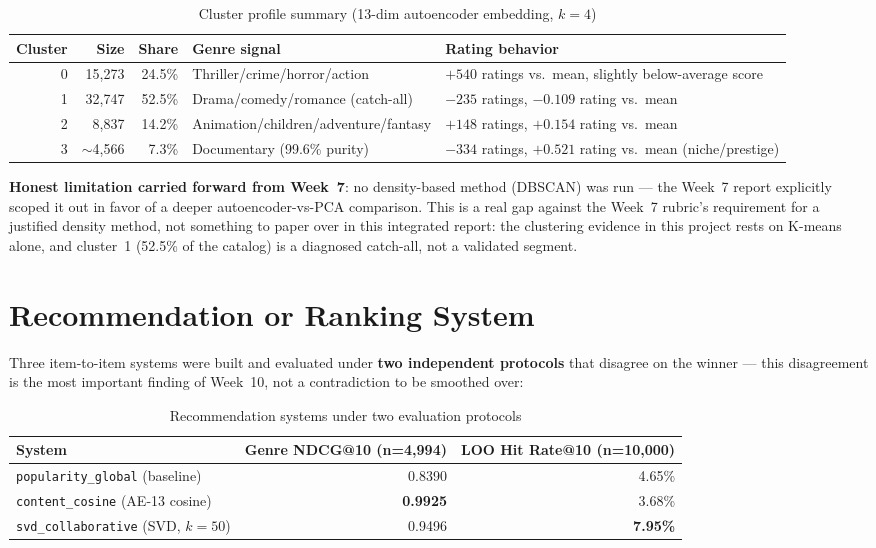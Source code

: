 \documentclass[12pt,a4paper]{article}
\begin{document}
\begin{table}[H]
\centering
\caption{Cluster profile summary (13-dim autoencoder embedding, $k=4$)}
\begin{tabular}{rrrp{3.6cm}p{3.6cm}}
\toprule
\textbf{Cluster} & \textbf{Size} & \textbf{Share} & \textbf{Genre signal} & \textbf{Rating behavior} \\
\midrule
0 & 15,273 & 24.5\% & Thriller/crime/horror/action & $+540$ ratings vs.\ mean, slightly below-average score \\
1 & 32,747 & 52.5\% & Drama/comedy/romance (catch-all) & $-235$ ratings, $-0.109$ rating vs.\ mean \\
2 & 8,837  & 14.2\% & Animation/children/adventure/fantasy & $+148$ ratings, $+0.154$ rating vs.\ mean \\
3 & $\sim$4,566 & 7.3\% & Documentary (99.6\% purity) & $-334$ ratings, $+0.521$ rating vs.\ mean (niche/prestige) \\
\bottomrule
\end{tabular}
\end{table}

\textbf{Honest limitation carried forward from Week~7}: no density-based method (DBSCAN) was run
--- the Week~7 report explicitly scoped it out in favor of a deeper autoencoder-vs-PCA comparison.
This is a real gap against the Week~7 rubric's requirement for a justified density method, not
something to paper over in this integrated report: the clustering evidence in this project rests on
K-means alone, and cluster~1 (52.5\% of the catalog) is a diagnosed catch-all, not a validated
segment.

\section{Recommendation or Ranking System}

Three item-to-item systems were built and evaluated under \textbf{two independent protocols} that
disagree on the winner --- this disagreement is the most important finding of Week~10, not a
contradiction to be smoothed over:

\begin{table}[H]
\centering
\caption{Recommendation systems under two evaluation protocols}
\begin{tabular}{lrr}
\toprule
\textbf{System} & \textbf{Genre NDCG@10 (n=4,994)} & \textbf{LOO Hit Rate@10 (n=10,000)} \\
\midrule
\texttt{popularity\_global} (baseline) & 0.8390 & 4.65\% \\
\texttt{content\_cosine} (AE-13 cosine) & \textbf{0.9925} & 3.68\% \\
\texttt{svd\_collaborative} (SVD, $k=50$) & 0.9496 & \textbf{7.95\%} \\
\bottomrule
\end{tabular}
\end{table}
\end{document}
